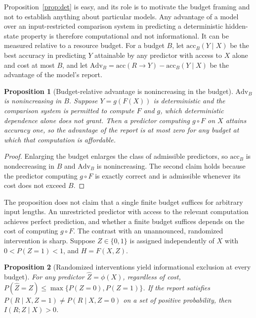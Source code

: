 \documentclass[11pt]{article}
\newtheorem{proposition}{Proposition}
\theoremstyle{definition}
\theoremstyle{remark}
\begin{document}
Proposition~\ref{prop:det} is easy, and its role is to motivate the budget framing and not to establish anything about particular models. Any advantage of a model over an input-restricted comparison system in predicting a deterministic hidden-state property is therefore computational and not informational. It can be measured relative to a resource budget. For a budget $B$, let $\mathrm{acc}_B(Y\mid X)$ be the best accuracy in predicting $Y$ attainable by any predictor with access to $X$ alone and cost at most $B$, and let $\mathrm{Adv}_B=\mathrm{acc}(R\to Y)-\mathrm{acc}_B(Y\mid X)$ be the advantage of the model's report.

\begin{proposition}[Budget-relative advantage is nonincreasing in the budget]\label{prop:budget}
$\mathrm{Adv}_B$ is nonincreasing in $B$. Suppose $Y=g(F(X))$ is deterministic and the comparison system is permitted to compute $F$ and $g$, which deterministic dependence alone does not grant. Then a predictor computing $g\circ F$ on $X$ attains accuracy one, so the advantage of the report is at most zero for any budget at which that computation is affordable.
\end{proposition}

\begin{proof}
Enlarging the budget enlarges the class of admissible predictors, so $\mathrm{acc}_B$ is nondecreasing in $B$ and $\mathrm{Adv}_B$ is nonincreasing. The second claim holds because the predictor computing $g\circ F$ is exactly correct and is admissible whenever its cost does not exceed $B$.
\end{proof}

The proposition does not claim that a single finite budget suffices for arbitrary input lengths. An unrestricted predictor with access to the relevant computation achieves perfect prediction, and whether a finite budget suffices depends on the cost of computing $g\circ F$. The contrast with an unannounced, randomized intervention is sharp. Suppose $Z\in\{0,1\}$ is assigned independently of $X$ with $0<P(Z=1)<1$, and $H=F(X,Z)$.

\begin{proposition}[Randomized interventions yield informational exclusion at every budget]\label{prop:rand}
For any predictor $\hat Z=\phi(X)$, regardless of cost, $P(\hat Z=Z)\le\max\{P(Z=0),P(Z=1)\}$. If the report satisfies $P(R\mid X,Z=1)\neq P(R\mid X,Z=0)$ on a set of positive probability, then $I(R;Z\mid X)>0$.
\end{proposition}
\end{document}
